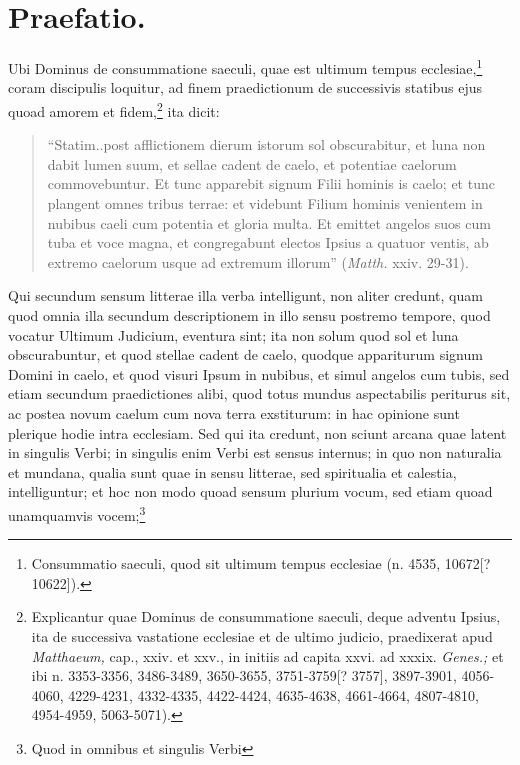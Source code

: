 \chapter*{Praefatio.}

\begin{topic}{1}
    Ubi Dominus de consummatione saeculi, quae est ultimum tempus ecclesiae,\footnote{Consummatio saeculi, quod sit
    ultimum tempus ecclesiae (n. 4535, 10672[? 10622]).} coram discipulis loquitur, ad finem praedictionum de
    successivis statibus ejus quoad amorem et fidem,\footnote{Explicantur quae Dominus de consummatione saeculi, deque
    adventu Ipsius, ita de successiva vastatione ecclesiae et de ultimo judicio, praedixerat apud \emph{Matthaeum,}
    cap., xxiv. et xxv., in initiis ad capita xxvi. ad xxxix.  \emph{Genes.;} et ibi n. 3353-3356, 3486-3489, 3650-3655,
    3751-3759[? 3757], 3897-3901, 4056-4060, 4229-4231, 4332-4335, 4422-4424, 4635-4638, 4661-4664, 4807-4810,
    4954-4959, 5063-5071).} ita dicit:
    \begin{quote}
        ``Statim..post afflictionem dierum istorum sol obscurabitur, et luna non dabit lumen suum, et sellae cadent de
        caelo, et potentiae caelorum commovebuntur.
        Et tunc apparebit signum Filii hominis is caelo; et tunc plangent omnes tribus terrae: et videbunt Filium
        hominis venientem in nubibus caeli cum potentia et gloria multa.
        Et emittet angelos suos cum tuba et voce magna, et congregabunt electos Ipsius a quatuor ventis, ab extremo
        caelorum usque ad extremum illorum'' (\emph{Matth.} xxiv. 29-31).
    \end{quote}
    Qui secundum sensum litterae illa verba intelligunt, non aliter credunt, quam quod omnia illa secundum descriptionem
    in illo sensu postremo tempore, quod vocatur Ultimum Judicium, eventura sint; ita non solum quod sol et luna
    obscurabuntur, et quod stellae cadent de caelo, quodque appariturum signum Domini in caelo, et quod visuri Ipsum in
    nubibus, et simul angelos cum tubis, sed etiam secundum praedictiones alibi, quod totus mundus aspectabilis
    periturus sit, ac postea novum caelum cum nova terra exstiturum: in hac opinione sunt plerique hodie intra
    ecclesiam.
    Sed qui ita credunt, non sciunt arcana quae latent in singulis Verbi; in singulis enim Verbi est sensus internus; in
    quo non naturalia et mundana, qualia sunt quae in sensu litterae, sed spiritualia et calestia, intelliguntur; et hoc
    non modo quoad sensum plurium vocum, sed etiam quoad unamquamvis vocem;\footnote{Quod in omnibus et singulis Verbi
}
\end{topic}
